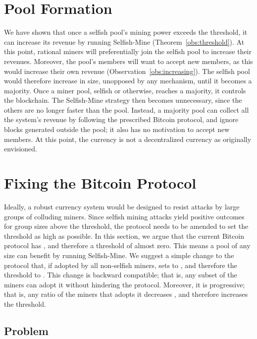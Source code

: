 \documentclass[letterpaper]{llncs}
\newcommand{\negspace}{\vspace{-0.5\baselineskip}}
\begin{document}
    \section{Pool Formation} \label{sec:poolFormation} 

We have shown that once a selfish pool's mining power exceeds the threshold, it can increase its revenue by running Selfish-Mine (Theorem~\ref{obs:threshold}). 
At this point, rational miners will preferentially join the selfish pool to increase their revenues. 
Moreover, the pool's members will want to accept new members, as this would increase their own revenue (Observation~\ref{obs:increasing}). 
The selfish pool would therefore increase in size, unopposed by any mechanism, until it becomes a majority. 
Once a miner pool, selfish or otherwise, reaches a majority, it controls the blockchain. 
The Selfish-Mine strategy then becomes unnecessary, since the others are no longer faster than the pool.
Instead, a majority pool can collect all the system's revenue by following the prescribed Bitcoin protocol, and ignore blocks generated outside the pool; it also has no motivation to accept new members. 
At this point, the currency is not a decentralized currency as originally envisioned. 



    \section{Fixing the Bitcoin Protocol} \label{sec:btcPatch} 
    
Ideally, a robust currency system would be designed to resist attacks by large groups of colluding miners. Since selfish mining attacks yield positive outcomes for group sizes above the threshold, the protocol needs to be amended to set the threshold as high as possible. In this section, we argue that the current Bitcoin protocol has , and therefore a threshold of almost zero.
This means a pool of any size can benefit by running Selfish-Mine. We suggest a simple change to the protocol that, if adopted by all non-selfish miners, sets  to , and therefore the threshold to . This change is backward compatible; that is, any subset of the miners can adopt it without hindering the protocol. Moreover, it is progressive; that is, any ratio of the miners that adopts it decreases , and therefore increases the threshold. 

        \subsection{Problem}
        \negspace
\end{document}
